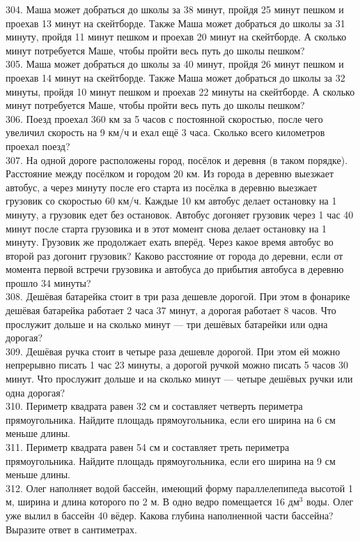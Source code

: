 304. Маша может добраться до школы за 38 минут, пройдя 25 минут пешком и проехав 13 минут на скейтборде. Также Маша может добраться до школы за 31 минуту, пройдя 11 минут пешком и проехав 20 минут на скейтборде. А сколько минут потребуется Маше, чтобы пройти весь путь до школы пешком?\\
305. Маша может добраться до школы за 40 минут, пройдя 26 минут пешком и проехав 14 минут на скейтборде. Также Маша может добраться до школы за 32 минуты, пройдя 10 минут пешком и проехав 22 минуты на скейтборде. А сколько минут потребуется Маше, чтобы пройти весь путь до школы пешком?\\
306. Поезд проехал 360 км за 5 часов с постоянной скоростью, после чего увеличил скорость на 9 км/ч и ехал ещё 3 часа. Сколько всего километров проехал поезд?\\
307. На одной дороге расположены город, посёлок и деревня (в таком порядке). Расстояние между посёлком и городом 20 км. Из города в деревню выезжает автобус, а через минуту после его старта из посёлка в деревню выезжает грузовик со скоростью 60 км/ч. Каждые 10 км автобус делает остановку на 1 минуту, а грузовик едет без остановок. Автобус догоняет грузовик через 1 час 40 минут после старта грузовика и в этот момент снова делает остановку на 1 минуту. Грузовик же продолжает ехать вперёд. Через какое время автобус во второй раз догонит грузовик? Каково расстояние от города до деревни, если от момента первой встречи грузовика и автобуса до прибытия автобуса в деревню прошло 34 минуты?\\
308. Дешёвая батарейка стоит в три раза дешевле дорогой. При этом в фонарике дешёвая батарейка работает 2 часа 37 минут, а дорогая работает 8 часов. Что прослужит дольше и на сколько минут --- три дешёвых батарейки или одна дорогая?\\
309. Дешёвая ручка стоит в четыре раза дешевле дорогой. При этом ей можно непрерывно писать 1 час 23 минуты, а дорогой ручкой можно писать 5 часов 30 минут. Что прослужит дольше и на сколько минут --- четыре дешёвых ручки или одна дорогая?\\
310. Периметр квадрата равен 32 см и составляет четверть периметра прямоугольника. Найдите площадь прямоугольника, если его ширина на 6 см меньше длины.\\
311. Периметр квадрата равен 54 см и составляет треть периметра прямоугольника. Найдите площадь прямоугольника, если его ширина на 9 см меньше длины.\\
312. Олег наполняет водой бассейн, имеющий форму параллелепипеда высотой 1 м, ширина и длина которого по 2 м. В одно ведро помещается $16\text{ дм}^3$ воды. Олег уже вылил в бассейн 40 вёдер. Какова глубина наполненной части бассейна? Выразите ответ в сантиметрах.\\
